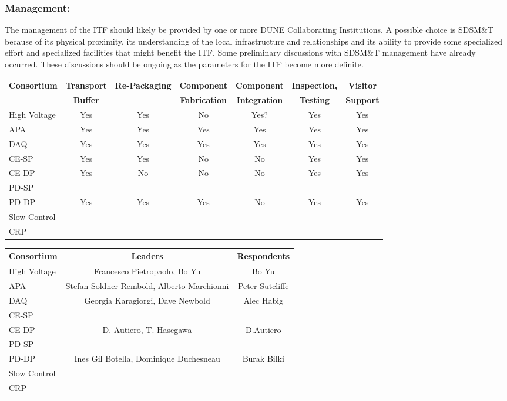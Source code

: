 \subsubsection{Management:}
The management of the ITF should likely be provided by one or more
DUNE Collaborating Institutions. A possible choice is SDSM\&T because
of its physical proximity, its understanding of the local
infrastructure and relationships and its ability to provide some
specialized effort and specialized facilities that might benefit
the ITF.  Some preliminary discussions with SDSM\&T management
have already occurred. These discussions should be ongoing as the
parameters for the ITF become more definite.
\begin{center}
\begin{tabular}{|l|c|c|c|c|c|c| } 
\hline
{\bf Consortium} & {\bf Transport} &{\bf Re-Packaging}&{\bf Component}
&{\bf Component}&{\bf Inspection,}&{\bf Visitor} \\
 & {\bf Buffer} &{\bf }&{\bf Fabrication}
&{\bf Integration}&{\bf Testing}&{\bf Support} \\\hline 
High Voltage & Yes & Yes & No & Yes? & Yes & Yes \\ \hline
APA & Yes & Yes & Yes & Yes & Yes & Yes \\ \hline
DAQ & Yes & Yes & Yes & Yes & Yes & Yes \\ \hline
CE-SP & Yes & Yes & No & No & Yes & Yes \\ \hline
CE-DP & Yes & No & No & No & Yes & Yes \\ \hline
PD-SP & & & & & &  \\ \hline
PD-DP & Yes & Yes & Yes & No & Yes & Yes \\ \hline
Slow Control & & & & & &  \\ \hline
CRP & & & & & &  \\   \hline
\end{tabular}
\end{center}
\begin{center}
\begin{tabular}{|l|c|c|} \hline
{\bf Consortium} & {\bf Leaders} &{\bf Respondents} \\ \hline
High Voltage & Francesco Pietropaolo, Bo Yu & Bo Yu \\ \hline
APA & Stefan Soldner-Rembold, Alberto Marchionni & Peter Sutcliffe \\ \hline
DAQ & Georgia Karagiorgi, Dave Newbold & Alec Habig \\ \hline
CE-SP & & \\ \hline
CE-DP & D. Autiero, T. Hasegawa &  D.Autiero  \\ \hline
PD-SP & & \\ \hline
PD-DP & Ines Gil Botella, Dominique Duchesneau & Burak Bilki \\ \hline
Slow Control & &   \\ \hline
CRP & &  \\   \hline
\end{tabular}
\end{center}

